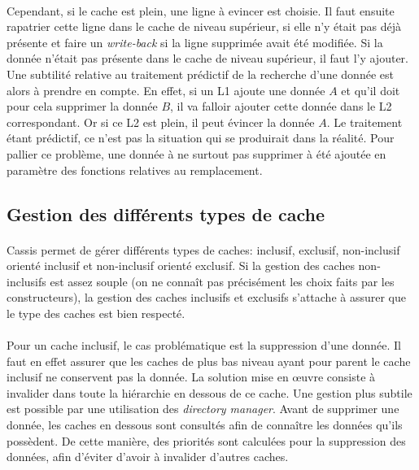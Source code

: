 \paragraph{}
Cependant, si le cache est plein, une ligne à evincer est choisie. Il faut ensuite rapatrier cette ligne dans le cache de niveau supérieur, si elle n'y était pas déjà présente et faire un \emph{write-back} si la ligne supprimée avait été modifiée. Si la donnée n'était pas présente dans le cache de niveau supérieur, il faut l'y ajouter. Une subtilité relative au traitement prédictif de la recherche d'une donnée est alors à prendre en compte. En effet, si un L1 ajoute une donnée $A$ et qu'il doit pour cela supprimer la donnée $B$, il va falloir ajouter cette donnée dans le L2 correspondant. Or si ce L2 est plein, il peut évincer la donnée $A$. Le traitement étant prédictif, ce n'est pas la situation qui se produirait dans la réalité. Pour pallier ce problème, une donnée à ne surtout pas supprimer à été ajoutée en paramètre des fonctions relatives au remplacement.


\subsection{Gestion des différents types de cache}
\paragraph{}
\textsf{Cassis} permet de gérer différents types de caches: inclusif, exclusif, non-inclusif orienté inclusif et non-inclusif orienté exclusif. Si la gestion des caches non-inclusifs est assez souple (on ne connaît pas précisément les choix faits par les constructeurs), la gestion des caches inclusifs et exclusifs s'attache à assurer que le type des caches est bien respecté.

\paragraph{}
Pour un cache inclusif, le cas problématique est la suppression d'une donnée. Il faut en effet assurer que les caches de plus bas niveau ayant pour parent le cache inclusif ne conservent pas la donnée. La solution mise en {\oe}uvre consiste à invalider dans toute la hiérarchie en dessous de ce cache. Une gestion plus subtile est possible par une utilisation des \emph{directory manager}. Avant de supprimer une donnée, les caches en dessous sont consultés afin de connaître les données qu'ils possèdent. De cette manière, des priorités sont calculées pour la suppression des données, afin d'éviter d'avoir à invalider d'autres caches.

